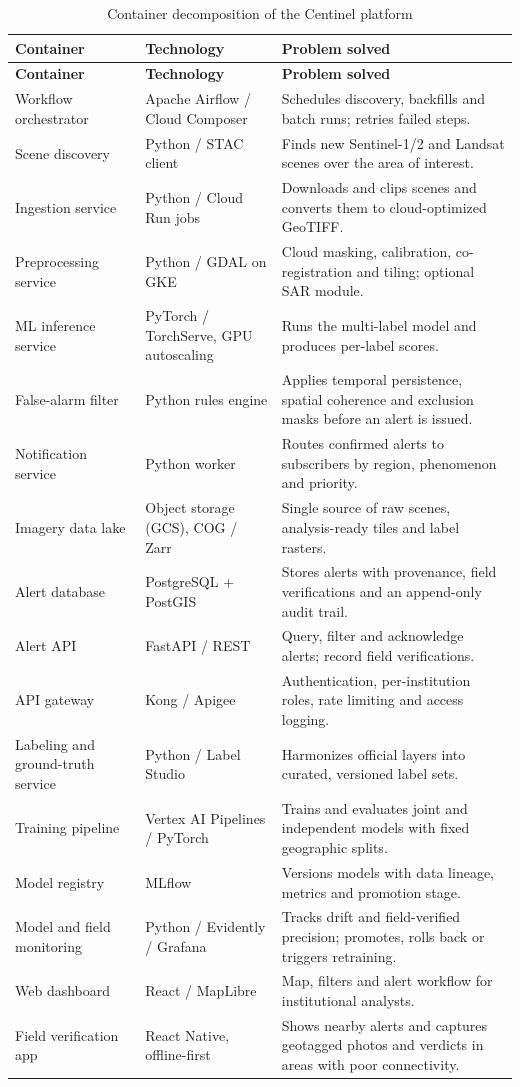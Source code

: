 \documentclass{article}
\begin{document}
{\small
\begin{longtable}{@{}p{3.3cm}p{3.7cm}p{8cm}@{}}
\caption{Container decomposition of the Centinel platform}
\label{tab:containers}\\
\toprule
\textbf{Container} & \textbf{Technology} & \textbf{Problem solved} \\
\midrule
\endfirsthead
\toprule
\textbf{Container} & \textbf{Technology} & \textbf{Problem solved} \\
\midrule
\endhead
\bottomrule
\endlastfoot
Workflow orchestrator & Apache Airflow / Cloud Composer & Schedules discovery, backfills and batch runs; retries failed steps. \\
Scene discovery & Python / STAC client & Finds new Sentinel-1/2 and Landsat scenes over the area of interest. \\
Ingestion service & Python / Cloud Run jobs & Downloads and clips scenes and converts them to cloud-optimized GeoTIFF. \\
Preprocessing service & Python / GDAL on GKE & Cloud masking, calibration, co-registration and tiling; optional SAR module. \\
ML inference service & PyTorch / TorchServe, GPU autoscaling & Runs the multi-label model and produces per-label scores. \\
False-alarm filter & Python rules engine & Applies temporal persistence, spatial coherence and exclusion masks before an alert is issued. \\
Notification service & Python worker & Routes confirmed alerts to subscribers by region, phenomenon and priority. \\
Imagery data lake & Object storage (GCS), COG / Zarr & Single source of raw scenes, analysis-ready tiles and label rasters. \\
Alert database & PostgreSQL + PostGIS & Stores alerts with provenance, field verifications and an append-only audit trail. \\
Alert API & FastAPI / REST & Query, filter and acknowledge alerts; record field verifications. \\
API gateway & Kong / Apigee & Authentication, per-institution roles, rate limiting and access logging. \\
Labeling and ground-truth service & Python / Label Studio & Harmonizes official layers into curated, versioned label sets. \\
Training pipeline & Vertex AI Pipelines / PyTorch & Trains and evaluates joint and independent models with fixed geographic splits. \\
Model registry & MLflow & Versions models with data lineage, metrics and promotion stage. \\
Model and field monitoring & Python / Evidently / Grafana & Tracks drift and field-verified precision; promotes, rolls back or triggers retraining. \\
Web dashboard & React / MapLibre & Map, filters and alert workflow for institutional analysts. \\
Field verification app & React Native, offline-first & Shows nearby alerts and captures geotagged photos and verdicts in areas with poor connectivity. \\
\end{longtable}
}
\end{document}
